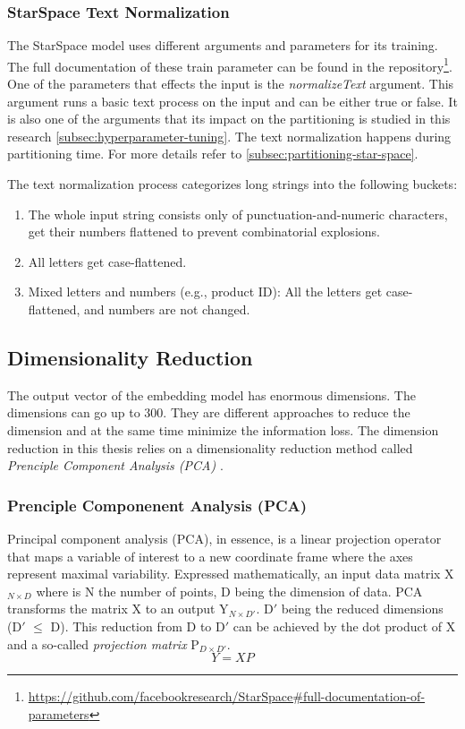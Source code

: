 \subsubsection{StarSpace Text Normalization}
\label{subsubsec:star-space-text-normalization}
The StarSpace model uses different arguments and parameters for its training. The full documentation of these train parameter can be found in the repository\footnote{\url{https://github.com/facebookresearch/StarSpace\#full-documentation-of-parameters}}. One of the parameters that effects the input is the \emph{normalizeText} argument. This argument runs a basic text process on the input and can be either true or false. It is also one of the arguments that its impact on the partitioning is studied in this research \ref{subsec:hyperparameter-tuning}. The text normalization happens during partitioning time. For more details refer to \ref{subsec:partitioning-star-space}.


The text normalization process categorizes long strings into the following buckets:

\begin{enumerate}
    \item The whole input string consists only of punctuation-and-numeric characters, get their numbers flattened to prevent combinatorial explosions.
    \item All letters get case-flattened.
    \item Mixed letters and numbers (e.g., product ID): All the letters get case-flattened, and numbers are not changed.
\end{enumerate}

\subsection{Dimensionality Reduction}
\label{subsec:dimension-reduction}
The output vector of the embedding model has enormous dimensions. The dimensions can go up to 300. They are different approaches to reduce the dimension and at the same time minimize the information loss. The dimension reduction in this thesis relies on a dimensionality reduction method called \emph{Prenciple Component Analysis (PCA)} \cite{woldPrincipalComponentAnalysis1987}.

\subsubsection{Prenciple Componenent Analysis (PCA)}
\label{subsubsec:pca}
Principal component analysis (PCA), in essence, is a linear projection operator that maps a variable of interest to a new coordinate frame where the axes represent maximal variability. Expressed mathematically, an input data matrix X$_{N \times D}$ where is N the number of points, D being the dimension of data. PCA transforms the matrix X to an output Y$_{N \times D\prime}$. D$\prime$ being the reduced dimensions (D$\prime$ $\leq$ D). This reduction from D to D$\prime$ can be achieved by the dot product of X and a so-called \emph{projection matrix} P$_{D \times D\prime}$.
    \begin{equation}
        \label{PCA}
        Y = XP
    \end{equation}

